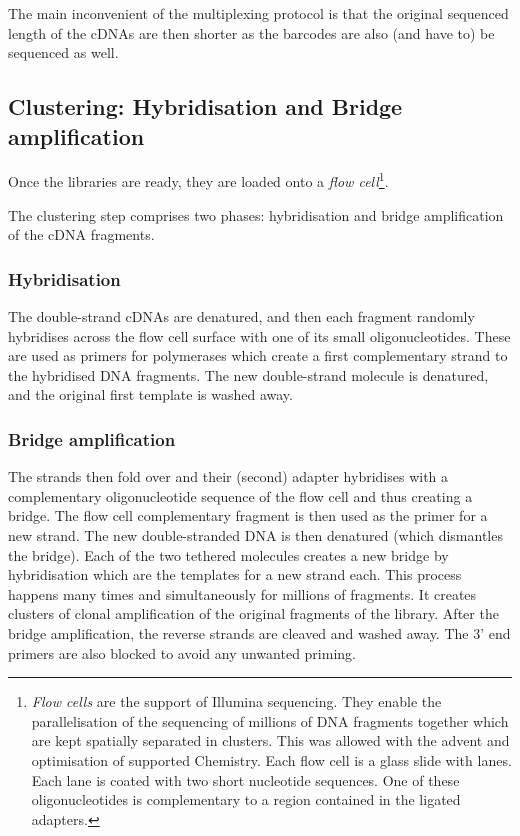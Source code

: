 The main inconvenient of the multiplexing protocol is that the original sequenced
length of the \glspl{cDNA} are then shorter as the barcodes are also (and have
to) be sequenced as well.

\subsection[Clustering: Hybridisation and Bridge amplification]{Clustering:
Hybridisation and Bridge amplification~\small{}\quad}%
\label{sub:HybridClustAmp}

\vspace{-4mm}
Once the libraries are ready, they are loaded onto a \emph{flow cell}\footnote{%
\emph{Flow cells} are the support of Illumina sequencing. They enable the
parallelisation of the sequencing of millions of \gls{DNA} fragments together
which are kept spatially separated in clusters. This was allowed with the advent
and optimisation of supported Chemistry. Each flow cell is a glass slide with
lanes. Each lane is coated with two short nucleotide sequences. One of these
oligonucleotides is complementary to a region contained in the ligated adapters.}.

The clustering step comprises two phases: hybridisation and bridge amplification
of the \gls{cDNA} fragments.

\subsubsection{Hybridisation}

The double-strand \glspl{cDNA} are denatured, and then each fragment randomly
hybridises across the flow cell surface with one of its small oligonucleotides.
These are used as primers for polymerases which create a first complementary
strand to the hybridised \gls{DNA} fragments. The new double-strand molecule is
denatured, and the original first template is washed away.

\subsubsection{Bridge amplification}
The strands then fold over and their (second) adapter hybridises with a
complementary oligonucleotide sequence of the flow cell and thus creating a
bridge. The flow cell complementary fragment is then used as the primer for a new
strand. The new double-stranded \gls{DNA} is then denatured (which
dismantles the bridge). Each of the two tethered molecules creates a new
bridge by hybridisation which are the templates for a new strand each.
This process happens many times and simultaneously for millions of fragments.
It creates clusters of clonal amplification of the original fragments of
the library. After the bridge amplification, the reverse strands are cleaved
and washed away. The 3' end primers are also blocked to avoid any unwanted
priming.

